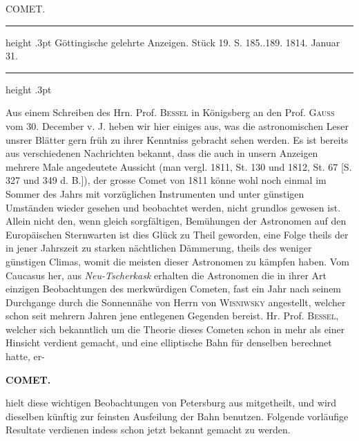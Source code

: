 \par\bigskip
{}
\hypertarget{native-378-lower}{}\label{native-378-lower}
\begin{center}\large COMET.\end{center}
\begin{center}
\parbox{.77\linewidth}{%
\centering\fontsize{8.2}{10.2}\selectfont
\hrule height .3pt\relax\vspace{2.5pt}
Göttingische gelehrte Anzeigen. Stück 19. S. 185..189. 1814. Januar 31.\par
\vspace{2.5pt}\hrule height .3pt\relax
}
\end{center}

\par\indent Aus einem Schreiben des Hrn. Prof. \textsc{Bessel} in Königsberg an den Prof. \textsc{Gauss} vom 30. December v. J. heben wir hier einiges aus, was die astronomischen Leser unsrer Blätter gern früh zu ihrer Kenntniss gebracht sehen werden. Es ist bereits aus verschiedenen Nachrichten bekannt, dass die auch in unsern Anzeigen mehrere Male angedeutete Aussicht (man vergl. 1811, St. 130 und 1812, St. 67 [S. 327 und 349 d. B.]), der grosse Comet von 1811 könne wohl noch einmal im Sommer des Jahrs mit vorzüglichen Instrumenten und unter günstigen Umständen wieder gesehen und beobachtet werden, nicht grundlos gewesen ist. Allein nicht den, wenn gleich sorgfältigen, Bemühungen der Astronomen auf den Europäischen Sternwarten ist dies Glück zu Theil geworden, eine Folge theils der in jener Jahrszeit zu starken nächtlichen Dämmerung, theils des weniger günstigen Climas, womit die meisten dieser Astronomen zu kämpfen haben. Vom Caucasus her, aus \emph{Neu-Tscherkask} erhalten die Astronomen die in ihrer Art einzigen Beobachtungen des merkwürdigen Cometen, fast ein Jahr nach seinem Durchgange durch die Sonnennähe von Herrn von \textsc{Wisniwsky} angestellt, welcher schon seit mehrern Jahren jene entlegenen Gegenden bereist. Hr. Prof. \textsc{Bessel}, welcher sich bekanntlich um die Theorie dieses Cometen schon in mehr als einer Hinsicht verdient gemacht, und eine elliptische Bahn für denselben berechnet hatte, er-\par
{}
\clearpage
\thispagestyle{empty}
\noindent{}%
%
\parbox[t]{\dimexpr\linewidth-24mm\relax}{\centering\footnotesize\bfseries COMET.\par}%
\makebox[12mm][r]{}\par\nobreak\medskip
\noindent hielt diese wichtigen Beobachtungen von Petersburg aus mitgetheilt, und wird dieselben künftig zur feinsten Ausfeilung der Bahn benutzen. Folgende vorläufige Resultate verdienen indess schon jetzt bekannt gemacht zu werden.

